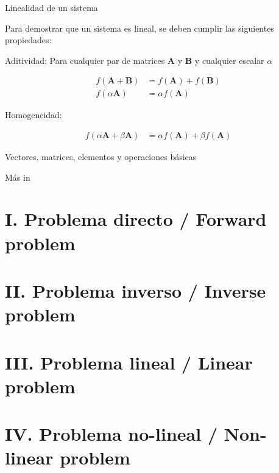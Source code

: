 \documentclass[aspectratio=169]{beamer}
\begin{document}
\begin{frame}
 {Linealidad de un sistema}
 
 \pause
 Para demostrar que un sistema es lineal, se deben cumplir las siguientes propiedades:

 Aditividad: \pause Para cualquier par de matrices {\bf A} y {\bf B} y cualquier escalar $\alpha$

\begin{align*}
f(\mathbf{A} + \mathbf{B}) &= f(\mathbf{A}) + f(\mathbf{B}) \\
f(\alpha \mathbf{A}) &= \alpha f(\mathbf{A})
\end{align*}
 
Homogeneidad: \pause

\begin{align*}
f(\alpha \mathbf{A} + \beta \mathbf{A}) &= \alpha f(\mathbf{A}) + \beta f(\mathbf{A})
\end{align*}

\end{frame}


\begin{frame}
 {Vectores, matrices, elementos y operaciones b\'asicas}

 \begin{center}
  \Large M\'as in \cite{Menke_2018_GEO}
 \end{center}
 
\end{frame}




\section{\small I. Problema directo / Forward problem}

\section{\small II. Problema inverso / Inverse problem}

\section{\small III. Problema lineal / Linear problem}

\section{\small IV. Problema no-lineal / Non-linear problem}
\end{document}
